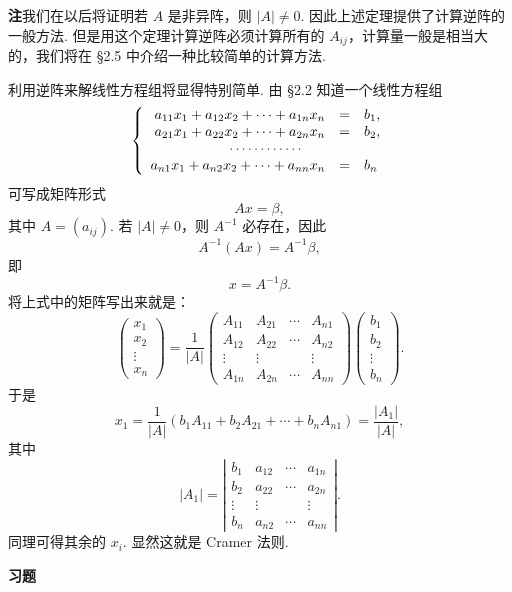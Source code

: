 \documentclass[UTF8, 12pt, fontset=fandol, oneside]{ctexart}
\begin{document}
\noindent\textbf{注}\quad 我们在以后将证明若 $A$ 是非异阵，则 $|A|\ne 0$. 因此上述定理提供了计算逆阵的一般方法. 但是用这个定理计算逆阵必须计算所有的 $A_{ij}$，计算量一般是相当大的，我们将在 §2.5 中介绍一种比较简单的计算方法.

利用逆阵来解线性方程组将显得特别简单. 由 §2.2 知道一个线性方程组
\[
\left\{\begin{array}{rcl}
a_{11}x_1+a_{12}x_2+\cdots+a_{1n}x_n&=&b_1,\\
a_{21}x_1+a_{22}x_2+\cdots+a_{2n}x_n&=&b_2,\\
\multicolumn{3}{c}{\cdots\cdots\cdots\cdots}\\
a_{n1}x_1+a_{n2}x_2+\cdots+a_{nn}x_n&=&b_n
\end{array}\right.
\]
可写成矩阵形式
\[
Ax=\beta,
\]
其中 $A=(a_{ij})$. 若 $|A|\ne 0$，则 $A^{-1}$ 必存在，因此
\[
A^{-1}(Ax)=A^{-1}\beta,
\]
即
\[
x=A^{-1}\beta.
\]
将上式中的矩阵写出来就是：
\[
\left(\begin{array}{c}
x_1\\
x_2\\
\vdots\\
x_n
\end{array}\right)
=\frac{1}{|A|}
\left(\begin{array}{cccc}
A_{11} & A_{21} & \cdots & A_{n1}\\
A_{12} & A_{22} & \cdots & A_{n2}\\
\vdots & \vdots & & \vdots\\
A_{1n} & A_{2n} & \cdots & A_{nn}
\end{array}\right)
\left(\begin{array}{c}
b_1\\
b_2\\
\vdots\\
b_n
\end{array}\right).
\]
于是
\[
x_1=\frac{1}{|A|}(b_1A_{11}+b_2A_{21}+\cdots+b_nA_{n1})=\frac{|A_1|}{|A|},
\]
其中
\[
|A_1|=\left|\begin{array}{cccc}
b_1 & a_{12} & \cdots & a_{1n}\\
b_2 & a_{22} & \cdots & a_{2n}\\
\vdots & \vdots & & \vdots\\
b_n & a_{n2} & \cdots & a_{nn}
\end{array}\right|.
\]
同理可得其余的 $x_i$. 显然这就是 Cramer 法则.

\begin{center}
\textbf{习\quad 题}
\end{center}
\end{document}
